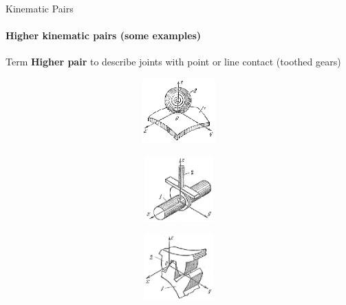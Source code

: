 \documentclass[aspectratio=169]{beamer}
\begin{document}
\begin{frame}[t]{Kinematic Pairs}
\framesubtitle{Higher kinematic pairs (some examples)}
\vspace{-0.3cm}
Term \textbf{Higher pair} to describe joints with point or line contact (toothed gears)
\vspace{-0.3cm}

\begin{figure}[H]
    \begin{subfigure}{0.32\textwidth}
        \centering\includegraphics[height=2.5cm,width=1\textwidth,keepaspectratio]{hkp_1.png}
        \label{fig:hkp_1.png}
    \end{subfigure}
    \begin{subfigure}{0.32\textwidth}
        \centering\includegraphics[height=2.5cm,width=1\textwidth,keepaspectratio]{hkp_2.png}
        \label{fig:hkp_2.png}
    \end{subfigure}
    \begin{subfigure}{0.32\textwidth}
        \centering\includegraphics[height=2.5cm,width=1\textwidth,keepaspectratio]{hkp_3.png}
        \label{fig:hkp_3.png}
    \end{subfigure}


\end{figure}
\end{frame}
\end{document}
